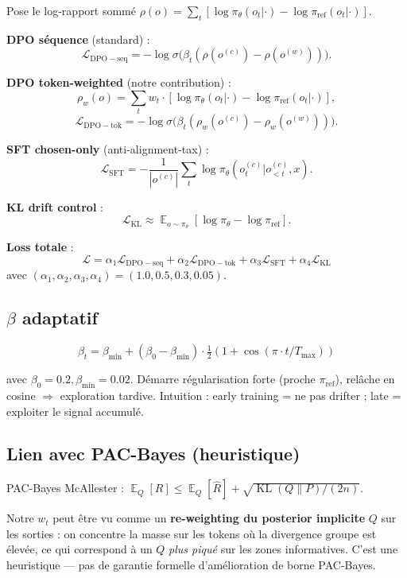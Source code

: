 \documentclass[10pt,a4paper]{article}
\DeclareMathOperator{\KL}{KL}
\DeclareMathOperator{\E}{\mathbb{E}}
\begin{document}
Pose le log-rapport sommé $\rho(o) = \sum_t [\log \pi_\theta(o_t | \cdot) - \log \pi_{\mathrm{ref}}(o_t | \cdot)]$.

\textbf{DPO séquence} (standard) :
\[
  \mathcal{L}_{\mathrm{DPO-seq}} = -\log \sigma\big(\beta_t (\rho(o^{(c)}) - \rho(o^{(w)}))\big).
\]

\textbf{DPO token-weighted} (notre contribution) :
\[
  \rho_w(o) = \sum_t w_t \cdot [\log \pi_\theta(o_t | \cdot) - \log \pi_{\mathrm{ref}}(o_t | \cdot)],
\]
\[
  \mathcal{L}_{\mathrm{DPO-tok}} = -\log \sigma\big(\beta_t (\rho_w(o^{(c)}) - \rho_w(o^{(w)}))\big).
\]

\textbf{SFT chosen-only} (anti-alignment-tax) :
\[
  \mathcal{L}_{\mathrm{SFT}} = -\frac{1}{|o^{(c)}|} \sum_t \log \pi_\theta(o^{(c)}_t | o^{(c)}_{<t}, x).
\]

\textbf{KL drift control} :
\[
  \mathcal{L}_{\mathrm{KL}} \approx \E_{o \sim \pi_\theta}[\log \pi_\theta - \log \pi_{\mathrm{ref}}].
\]

\textbf{Loss totale} :
\[
  \boxed{\mathcal{L} = \alpha_1 \mathcal{L}_{\mathrm{DPO-seq}} + \alpha_2 \mathcal{L}_{\mathrm{DPO-tok}} + \alpha_3 \mathcal{L}_{\mathrm{SFT}} + \alpha_4 \mathcal{L}_{\mathrm{KL}}}
\]
avec $(\alpha_1, \alpha_2, \alpha_3, \alpha_4) = (1.0, 0.5, 0.3, 0.05)$.

\subsection{$\beta$ adaptatif}

\[
  \beta_t = \beta_{\min} + (\beta_0 - \beta_{\min}) \cdot \tfrac{1}{2}(1 + \cos(\pi \cdot t/T_{\max}))
\]

avec $\beta_0 = 0.2, \beta_{\min} = 0.02$. Démarre régularisation forte (proche $\pi_{\mathrm{ref}}$), relâche en cosine $\Rightarrow$ exploration tardive. Intuition : early training = ne pas drifter ; late = exploiter le signal accumulé.

\subsection{Lien avec PAC-Bayes (heuristique)}

PAC-Bayes McAllester : $\E_Q[R] \le \E_Q[\hat R] + \sqrt{\KL(Q \| P)/(2n)}$.

Notre $w_t$ peut être vu comme un \textbf{re-weighting du posterior implicite} $Q$ sur les sorties : on concentre la masse sur les tokens où la divergence groupe est élevée, ce qui correspond à un $Q$ \emph{plus piqué} sur les zones informatives. C'est une heuristique --- pas de garantie formelle d'amélioration de borne PAC-Bayes.
\end{document}
